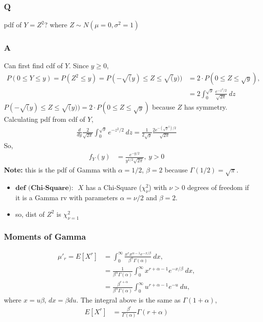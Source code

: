 \documentclass{article}
\begin{document}
    \subsubsection*{Q}
    pdf of $Y=Z^2$? where $Z\sim N(\mu=0,\sigma^2=1)$
    \subsubsection*{A}
    Can first find cdf of $Y$. Since $y\geq0$,
    \begin{align*}
        P(0\leq Y \leq y) = P(Z^2 \leq y) = P(-\sqrt(y)\leq Z \leq \sqrt(y)) &= 2\cdot P(0\leq Z \leq \sqrt{y}), \\
        &= 2\int_{0}^{\sqrt{y}} \frac{e^{-z^2/2}}{\sqrt{2\pi}}\ dz
    \end{align*}
    $P(-\sqrt(y)\leq Z \leq \sqrt(y)) = 2\cdot P(0\leq Z \leq \sqrt{y})$ because $Z$ has symmetry. Calculating pdf from cdf of $Y$,
    \begin{align*}
    \frac{d}{dy} \frac{2}{\sqrt{2\pi}} \int_{0}^{\sqrt{y}} e^{-z^2/2}\ dz = \frac{1}{2\sqrt{y}} \frac{2e^{-\left(\sqrt{y}^2\right)/2}}{\sqrt{2\pi}}
    \end{align*}
    So,
    \begin{align*}
    f_{Y}(y) &= \frac{e^{-y/2}}{y^{1/2}\sqrt{2\pi}},\ y>0
    \end{align*}
    \textbf{Note:} this is the pdf of Gamma with $\alpha=1/2$, $\beta=2$ because $\Gamma(1/2)=\sqrt{\pi}$.
    \begin{itemize}
    \item $\textbf{def (Chi-Square): }$ $X$ has a Chi-Square ($\chi^2_{\nu}$) with $\nu>0$ degrees of freedom if it is a Gamma rv with parameters $\alpha=\nu/2$ and $\beta=2$.
    \item so, dist of $Z^2$ is $\chi^2_{\nu=1}$
    \end{itemize}
    \subsubsection*{Moments of Gamma}
    \begin{align*}
    \mu'_{r} = E[X^r] &= \int_{0}^{\infty}\frac{x^{r}x^{\alpha-1}e^{-x/\beta}}{\beta^{\alpha}\Gamma(\alpha)}\ dx, \\
    &= \frac{1}{\beta^\alpha \Gamma(\alpha)}\int_{0}^{\infty}x^{r+\alpha-1}e^{-x/\beta}\ dx, \\
    &= \frac{\beta^{r+\alpha}}{\beta^\alpha \Gamma(\alpha)}\int_{0}^{\infty} u^{r+\alpha-1}e^{-u}\ du,
    \end{align*}
    where $x=u\beta$, $dx=\beta du$. The integral above is the same as $\Gamma(1+\alpha)$,
    \begin{align*}
    E[X^{r}] &= \frac{\beta^{r}}{\Gamma(\alpha)}\Gamma(r+\alpha)
\end{align*}
\end{document}
